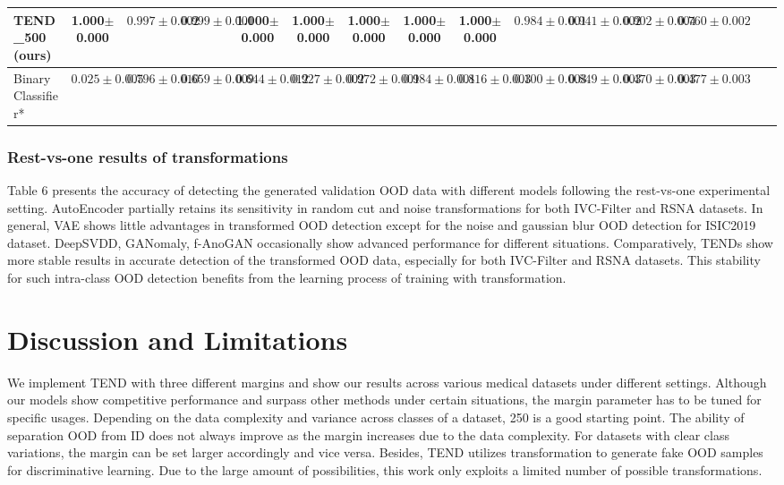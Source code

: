 \documentclass[12pt]{spieman}  %
\begin{document}
\begin{spacing}{2}
\begin{table} [htp]
{\begin{tabular}{|l|cccc|cccc|cccc|cccc|}
TEND\_500 (\textbf{ours})   & {\textbf{1.000$\pm$0.000}} & {$0.997\pm0.002$}      & {$0.999\pm0.001$} & {\textbf{1.000$\pm$0.000}}  & {\textbf{1.000$\pm$0.000}}    & {\textbf{1.000$\pm$0.000}}     & {\textbf{1.000$\pm$0.000}}   & {\textbf{1.000$\pm$0.000}} & {$0.984\pm0.001$} & {$0.941\pm0.002$} & {$0.902\pm0.004$} & {$0.760\pm0.002$} \\ 
\hline
BinaryClassifier*    & {$0.025\pm0.005$}    & {$0.796\pm0.010$}  & {$0.659\pm0.009$}  & {$0.644\pm0.012$}  & {$0.927\pm0.002$}      & {$0.972\pm0.001$}  & {$0.984\pm0.001$}  & {$0.816\pm0.003$}  & {$0.100\pm 0.003$} & {$0.849\pm0.003$} & {$0.470\pm0.003$} & {$0.477\pm0.003$} \\ \hline
\end{tabular}%
}
\end{table}

\subsubsection{Rest-vs-one results of transformations}
Table 6 presents the accuracy of detecting the generated validation OOD data with different models following the rest-vs-one experimental setting. AutoEncoder partially retains its sensitivity in random cut and noise transformations for both IVC-Filter and RSNA datasets. In general, VAE shows little advantages in transformed OOD detection except for the noise and gaussian blur OOD detection for ISIC2019 dataset. DeepSVDD, GANomaly, f-AnoGAN occasionally show advanced performance for different situations. Comparatively, TENDs show more stable results in accurate detection of the transformed OOD data, especially for both IVC-Filter and RSNA datasets. This stability for such intra-class OOD detection benefits from the learning process of training with transformation.
\section{Discussion and Limitations}
We implement TEND with three different margins and show our results across various medical datasets under different settings. Although our models show competitive performance and surpass other methods under certain situations, the margin parameter has to be tuned for specific usages. Depending on the data complexity and variance across classes of a dataset, 250 is a good starting point. The ability of separation OOD from ID does not always improve as the margin increases due to the data complexity. For datasets with clear class variations, the margin can be set larger accordingly and vice versa. Besides, TEND utilizes transformation to generate fake OOD samples for discriminative learning. Due to the large amount of possibilities, this work only exploits a limited number of possible transformations.


\end{spacing}
\end{document}

